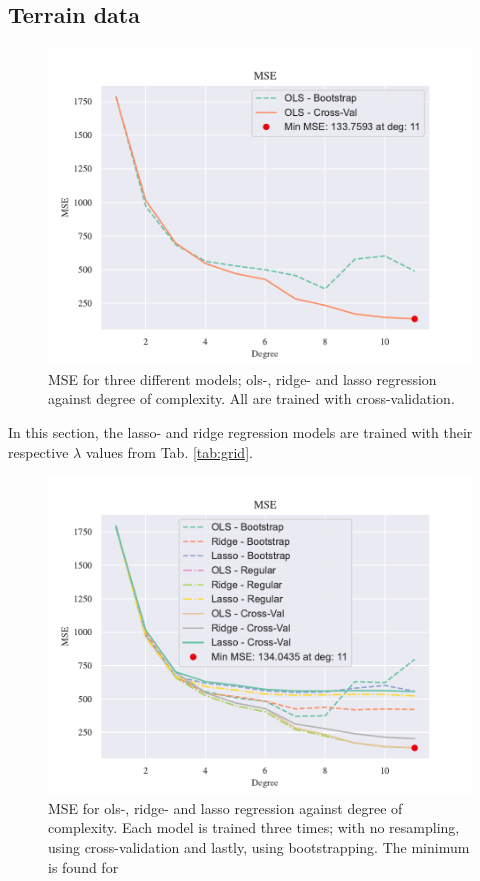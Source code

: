 \subsection{Terrain data}

\begin{figure}[h!]
    \centering
    \includegraphics[width=1\linewidth]{project_1_alt/figures/figures_in_report/CV_BS_OLS_Terrain.pdf}
    \caption{MSE for three different models; ols-, ridge- and lasso regression against degree of complexity. All are trained with cross-validation.}
    \label{all_terrain_cv}
\end{figure}


In this section, the lasso- and ridge regression models are trained with their respective $\lambda$ values from Tab. \ref{tab:grid}. 

\begin{figure}[h!]
    \centering
    \includegraphics[width=1\linewidth]{project_1_alt/figures/figures_in_report/All_Terrain.pdf}
    \caption{MSE for ols-, ridge- and lasso regression against degree of complexity. Each model is trained three times; with no resampling, using cross-validation and lastly, using bootstrapping. The minimum is found for }
    \label{all_terrain_OLS}
\end{figure}

